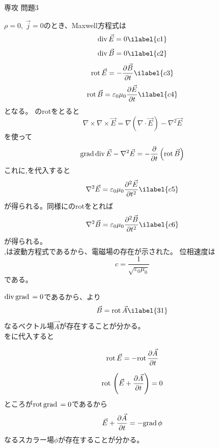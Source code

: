 \documentclass[fleqn]{jbook}
\begin{document}
\begin{answer}{専攻 問題3}{}
\begin{subanswers}
\begin{subsubanswers}
  \SubSubAnswer
    $\rho=0,\ \vec{j}=0$のとき、Maxwell方程式は
    \begin{eqnarray}
      \Div \vec{E} = 0
      \ilabel{c1}
    \end{eqnarray}
    \begin{eqnarray}
      \Div \vec{B} = 0
      \ilabel{c2}
    \end{eqnarray}
    \begin{eqnarray}
      \Rot \vec{E} = - \frac { \partial \vec{B} } { \partial t}
      \ilabel{c3}
    \end{eqnarray}
    \begin{eqnarray}
      \Rot \vec{B} = \varepsilon_{0}\mu_{0}\frac{\partial \vec{E}}{\partial t}
      \ilabel{c4}
    \end{eqnarray}
    となる。
    のrotをとると
    \[
      \nabla \times \nabla \times \vec{E} =
      \nabla \left( \nabla \cdot \vec{E} \right) - \nabla^{2} \vec{E} 
    \]
    を使って
    \[
      {\rm grad\,}{\rm div\,}\vec{E} - \nabla^{2} \vec{E} =
      - \frac{\partial}{\partial t}\left( {\rm rot\,}\vec{B} \right) 
    \]
    これに,を代入すると
    \begin{eqnarray}
      \nabla^{2} \vec{E} = %
      \varepsilon_{0}\mu_{0}\frac{\partial^{2} \vec{E}}{\partial t^{2}}
      \ilabel{c5}
    \end{eqnarray}
    が得られる。同様にのrotをとれば
    \begin{eqnarray}
      \nabla^{2} \vec{B} = %
      \varepsilon_{0}\mu_{0}\frac{\partial^{2} \vec{B}}{\partial t^{2}}
      \ilabel{c6}
    \end{eqnarray}
    が得られる。\\
    ,は波動方程式であるから、電磁場の存在が示された。
    位相速度は
    \[
      c = \frac{1}{\sqrt{\varepsilon_{0} \mu_{0}}}
    \]
    である。

  \SubSubAnswer
    ${\rm div\,}{\rm grad\,}=0$であるから、より
    \begin{eqnarray}
      \vec{B}=\Rot \vec{A}
      \ilabel{31}
    \end{eqnarray}
    なるベクトル場$\vec{A}$が存在することが分かる。\\
    をに代入すると

    \[
      {\rm rot\,}\vec{E}= -{\rm rot\,}\frac{\partial \vec{A}}{\partial t}
    \]

    \[
      {\rm rot\,}\left( \vec{E} + \frac{\partial \vec{A}}{\partial t} \right) = 0 
    \]
    ところが${\rm rot\,}{\rm grad\,}=0$であるから
    \[
     \vec{E} + \frac{\partial \vec{A}}{\partial t} = - {\rm grad\,}\phi
    \]
    なるスカラー場$\phi$が存在することが分かる。
  \end{subsubanswers}
\end{subanswers}
\end{answer}
\end{document}
